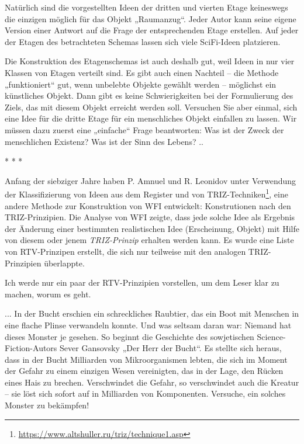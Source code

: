 \documentclass[11pt,a4paper]{article}
\begin{document}
Natürlich sind die vorgestellten Ideen der dritten und vierten Etage
keineswegs die einzigen möglich für das Objekt „Raumanzug“. Jeder Autor kann
seine eigene Version einer Antwort auf die Frage der entsprechenden Etage
erstellen. Auf jeder der Etagen des betrachteten Schemas lassen sich viele
SciFi-Ideen platzieren.

Die Konstruktion des Etagenschemas ist auch deshalb gut, weil Ideen in nur
vier Klassen von Etagen verteilt sind.  Es gibt auch einen Nachteil -- die
Methode „funktioniert“ gut, wenn unbelebte Objekte gewählt werden -- möglichst
ein künstliches Objekt. Dann gibt es keine Schwierigkeiten bei der
Formulierung des Ziels, das mit diesem Objekt erreicht werden soll. Versuchen
Sie aber einmal, sich eine Idee für die dritte Etage für ein menschliches
Objekt einfallen zu lassen. Wir müssen dazu zuerst eine „einfache“ Frage
beantworten: Was ist der Zweck der menschlichen Existenz? Was ist der Sinn des
Lebens? ..

\begin{center} * * * \end{center}

Anfang der siebziger Jahre haben P. Amnuel und R. Leonidov unter Verwendung
der Klassifizierung von Ideen aus dem Register und von
TRIZ-Techniken\footnote{\url{https://www.altshuller.ru/triz/technique1.asp}},
eine andere Methode zur Konstruktion von WFI entwickelt: Konstrutionen nach
den TRIZ-Prinzipien. Die Analyse von WFI zeigte, dass jede solche Idee als
Ergebnis der Änderung einer bestimmten realistischen Idee (Erscheinung,
Objekt) mit Hilfe von diesem oder jenem \emph{TRIZ-Prinzip} erhalten werden
kann. Es wurde eine Liste von RTV-Prinzipen erstellt, die sich nur teilweise
mit den analogen TRIZ-Prinzipien überlappte.

Ich werde nur ein paar der RTV-Prinzipien vorstellen, um dem Leser klar zu
machen, worum es geht.  

... In der Bucht erschien ein schreckliches Raubtier, das ein Boot mit
Menschen in eine flache Plinse verwandeln konnte. Und was seltsam daran war:
Niemand hat dieses Monster je gesehen. So beginnt die Geschichte des
sowjetischen Science-Fiction-Autors Sever Gansovsky „Der Herr der Bucht“.  Es
stellte sich heraus, dass in der Bucht Milliarden von Mikroorganismen lebten,
die sich im Moment der Gefahr zu einem einzigen Wesen vereinigten, das in der
Lage, den Rücken eines Hais zu brechen. Verschwindet die Gefahr, so
verschwindet auch die Kreatur -- sie löst sich sofort auf in Milliarden von
Komponenten.  Versuche, ein solches Monster zu bekämpfen!
\end{document}

